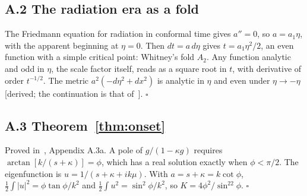 \documentclass[11pt]{article}
\theoremstyle{definition}\newtheorem{hypothesis}{Hypothesis}\newtheorem{prediction}{Prediction}
\theoremstyle{remark}\newtheorem{remark}[theorem]{Remark}
\newcommand{\grade}[1]{\textsf{\small[#1]}}
\begin{document}
\subsection*{A.2 The radiation era as a fold}
The Friedmann equation for radiation in conformal time gives $a''=0$, so $a=a_1\eta$, with the apparent beginning at $\eta=0$. Then $dt=a\,d\eta$ gives $t=a_1\eta^2/2$, an even function with a simple critical point: Whitney's fold $A_2$. Any function analytic and odd in $\eta$, the scale factor itself, reads as a square root in $t$, with derivative of order $t^{-1/2}$. The metric $a^2(-d\eta^2+dx^2)$ is analytic in $\eta$ and even under $\eta\to-\eta$ \grade{derived; the continuation is that of~\cite{BFT}}. $\square$

\subsection*{A.3 Theorem~\ref{thm:onset}}
Proved in~\cite{NU10}, Appendix A.3a. A pole of $g/(1-\kappa g)$ requires $\arctan[k/(s+\kappa)]=\phi$, which has a real solution exactly when $\phi<\pi/2$. The eigenfunction is $u=1/(s+\kappa+ik\mu)$. With $a=s+\kappa=k\cot\phi$, $\tfrac12\!\int|u|^2=\phi\tan\phi/k^2$ and $\tfrac12\!\int u^2=\sin^2\phi/k^2$, so $K=4\phi^2/\sin^22\phi$. $\square$
\end{document}
